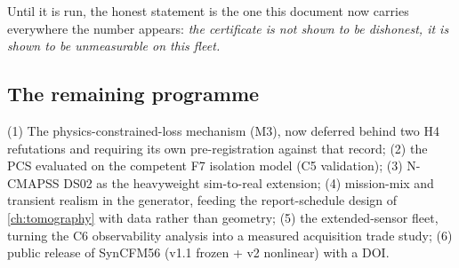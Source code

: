Until it is run, the honest statement is the one this document now carries everywhere the
number appears: \emph{the certificate is not shown to be dishonest, it is shown to be
unmeasurable on this fleet.}

\subsection{The remaining programme}

(1) The physics-constrained-loss mechanism (M3), now deferred behind two H4 refutations and
requiring its own pre-registration against that record; (2) the PCS evaluated on the
competent F7 isolation model (C5 validation); (3) N-CMAPSS DS02 as the heavyweight
sim-to-real extension; (4) mission-mix and transient realism in the generator, feeding the
report-schedule design of \cref{ch:tomography} with data rather than geometry; (5) the
extended-sensor fleet, turning the C6 observability analysis into a measured acquisition
trade study; (6) public release of SynCFM56 (v1.1 frozen + v2 nonlinear) with a DOI.
